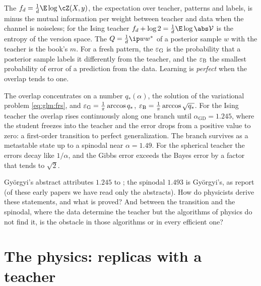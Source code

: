 \begin{refsection}
The  $f_d=\frac1d\E\log\cZ(X,y)$, the expectation over teacher, patterns and labels, is minus the mutual information per weight between teacher and data when the channel is noiseless; for the Ising teacher $f_d+\log2=\frac1d\E\log\abs\glmV$ is the entropy of the version space. The  $Q=\frac1d\ip w{w^*}$ of a posterior sample $w$ with the teacher is the book's $m$. For a fresh pattern, the  $\varepsilon_{\mathrm{G}}$ is the probability that a posterior sample labels it differently from the teacher, and the  $\varepsilon_{\mathrm{B}}$ the smallest probability of error of a prediction from the data. Learning is \emph{perfect} when the overlap tends to one.

\begin{physicsbox}
The overlap concentrates on a number $q_*(\alpha)$, the solution of the variational problem \eqref{eq:glm:frs}, and $\varepsilon_{\mathrm{G}}=\frac1\pi\arccos q_*$, $\varepsilon_{\mathrm{B}}=\frac1\pi\arccos\sqrt{q_*}$. For the Ising teacher the overlap rises continuously along one branch until $\alpha_{\mathrm{GD}}=1.245$, where the student freezes into the teacher and the error drops from a positive value to zero: a first-order transition to perfect generalization. The branch survives as a metastable state up to a spinodal near $\alpha=1.49$. For the spherical teacher the errors decay like $1/\alpha$, and the Gibbs error exceeds the Bayes error by a factor that tends to $\sqrt2$.
\end{physicsbox}

Gy\"orgyi's abstract attributes $1.245$ to \textcite{GardnerDerrida1989b}; the spinodal $1.493$ is Gy\"orgyi's, as \textcite{BarbierEtAl2019} report (of these early papers we have read only the abstracts). How do physicists derive these statements, and what is proved? And between the transition and the spinodal, where the data determine the teacher but the algorithms of physics do not find it, is the obstacle in those algorithms or in every efficient one?

\section{The physics: replicas with a teacher}\label{sec:glm:physics}


\end{refsection}
